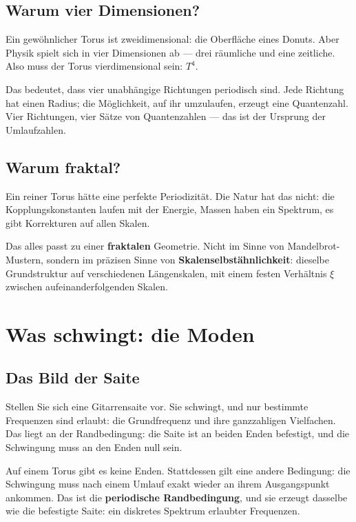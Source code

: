\documentclass[12pt,oneside]{book}
\begin{document}
\section{Warum vier Dimensionen?}

Ein gewöhnlicher Torus ist zweidimensional: die Oberfläche eines Donuts. Aber Physik spielt sich in vier Dimensionen ab — drei räumliche und eine zeitliche. Also muss der Torus vierdimensional sein: $T^4$.

Das bedeutet, dass vier unabhängige Richtungen periodisch sind. Jede Richtung hat einen Radius; die Möglichkeit, auf ihr umzulaufen, erzeugt eine Quantenzahl. Vier Richtungen, vier Sätze von Quantenzahlen — das ist der Ursprung der Um\-lauf\-zahlen.

\section{Warum fraktal?}

Ein reiner Torus hätte eine perfekte Periodizität. Die Natur hat das nicht: die Kopplungskonstanten laufen mit der Energie, Massen haben ein Spektrum, es gibt Korrekturen auf allen Skalen.

Das alles passt zu einer \textbf{fraktalen} Geometrie. Nicht im Sinne von Mandelbrot-Mustern, sondern im präzisen Sinne von \textbf{Skalenselbstähnlichkeit}: dieselbe Grundstruktur auf verschiedenen Längenskalen, mit einem festen Verhältnis $\xi$ zwischen aufeinanderfolgenden Skalen.

\chapter{Was schwingt: die Moden}

\section{Das Bild der Saite}

Stellen Sie sich eine Gitarrensaite vor. Sie schwingt, und nur bestimmte Frequenzen sind erlaubt: die Grundfrequenz und ihre ganzzahligen Vielfachen. Das liegt an der Randbedingung: die Saite ist an beiden Enden befestigt, und die Schwingung muss an den Enden null sein.

Auf einem Torus gibt es keine Enden. Stattdessen gilt eine andere Bedingung: die Schwingung muss nach einem Umlauf exakt wieder an ihrem Ausgangspunkt ankommen. Das ist die \textbf{periodische Randbedingung}, und sie erzeugt dasselbe wie die befestigte Saite: ein diskretes Spektrum erlaubter Frequenzen.
\end{document}
